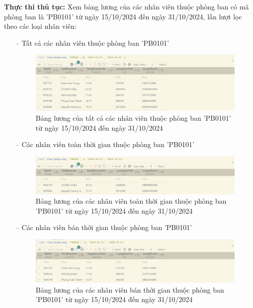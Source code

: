 \textbf{Thực thi thủ tục:} Xem bảng lương của các nhân viên thuộc phòng ban có mã phòng ban là 'PB0101' từ ngày 15/10/2024 đến ngày 31/10/2024, lần lượt lọc theo các loại nhân viên:
\begin{itemize}
    \item [--] Tất cả các nhân viên thuộc phòng ban 'PB0101'
    \begin{figure}[H]
        \centering
        \includegraphics[width=\linewidth]{./content/images/extra_2.png}
        \caption{Bảng lương của tất cả các nhân viên thuộc phòng ban 'PB0101' từ ngày 15/10/2024 đến ngày 31/10/2024}
        \label{fig:extra_2}
    \end{figure}
    \item [--] Các nhân viên toàn thời gian thuộc phòng ban 'PB0101'
    \begin{figure}[H]
        \centering
        \includegraphics[width=\linewidth]{./content/images/extra_3.png}
        \caption{Bảng lương của các nhân viên toàn thời gian thuộc phòng ban 'PB0101' từ ngày 15/10/2024 đến ngày 31/10/2024}
        \label{fig:extra_3}
    \end{figure}
    \item [--] Các nhân viên bán thời gian thuộc phòng ban 'PB0101'
    \begin{figure}[H]
        \centering
        \includegraphics[width=\linewidth]{./content/images/extra_4.png}
        \caption{Bảng lương của các nhân viên bán thời gian thuộc phòng ban 'PB0101' từ ngày 15/10/2024 đến ngày 31/10/2024}
        \label{fig:extra_4}
    \end{figure}
\end{itemize}
\newpage